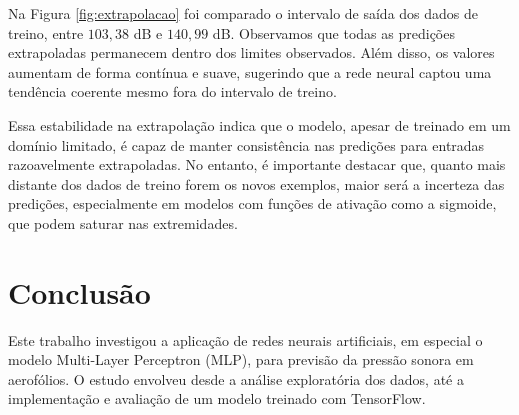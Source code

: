 \documentclass[12pt,a4paper,oneside]{report}
\begin{document}
Na Figura \ref{fig:extrapolacao} foi comparado o intervalo de saída dos dados de treino, entre $103{,}38$ dB e $140{,}99$ dB.  Observamos que todas as predições extrapoladas permanecem dentro dos limites observados. Além disso, os valores aumentam de forma contínua e suave, sugerindo que a rede neural captou uma tendência coerente mesmo fora do intervalo de treino.

Essa estabilidade na extrapolação indica que o modelo, apesar de treinado em um domínio limitado, é capaz de manter consistência nas predições para entradas razoavelmente extrapoladas. No entanto, é importante destacar que, quanto mais distante dos dados de treino forem os novos exemplos, maior será a incerteza das predições, especialmente em modelos com funções de ativação como a sigmoide, que podem saturar nas extremidades.
	
	\chapter{Conclus\~ao}
	
%	


Este trabalho investigou a aplicação de redes neurais artificiais, em especial o modelo Multi-Layer Perceptron (MLP), para previsão da pressão sonora em aerofólios. O estudo envolveu desde a análise exploratória dos dados, até a implementação e avaliação de um modelo treinado com TensorFlow.
\end{document}
